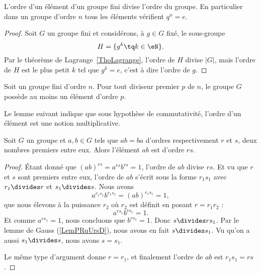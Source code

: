 \begin{corollary}       \label{CorpZItFX}
    L'ordre d'un élément d'un groupe fini divise l'ordre du groupe. En particulier dans un groupe d'ordre \( n\) tous les éléments vérifient \( q^n=e\).
\end{corollary}

\begin{proof}
    Soit \( G\) un groupe fini et considérons, à \( g \in G \) fixé, le sous-groupe
    \begin{equation}
        H=\{ g^k\tq k\in\eN \}.
    \end{equation}
    Par le théorème de Lagrange~\ref{ThoLagrange}, l'ordre de \( H\) divise \( | G |\), mais l'ordre de \( H\) est le plus petit \( k\) tel que \( g^k=e\), c'est à dire l'ordre de \( g\).
\end{proof}

\begin{theorem}    \label{THOooSUWKooICbzqM}
    Soit un groupe fini d'ordre \( n\). Pour tout diviseur premier \( p\) de \( n\), le groupe \( G\) possède au moins un élément d'ordre \( p\).
\end{theorem}

Le lemme suivant indique que sous hypothèse de commutativité, l'ordre d'un élément est une notion multiplicative.
\begin{lemma}    \label{LemyETtdy}
    Soit \( G\) un groupe et \( a,b\in G\) tels que \( ab=ba\) d'ordres respectivement \( r\) et \( s\), deux nombres premiers entre eux. Alors l'élément \( ab\) est d'ordre \( rs\).
\end{lemma}

\begin{proof}
    Étant donné que \( (ab)^{rs}=a^{rs}b^{rs}=1\), l'ordre de \( ab\) divise \( rs\). Et vu que \( r\) et \( s\) sont premiers entre eux, l'ordre de \( ab\) s'écrit sous la forme \( r_1s_1\) avec \( r_1\divides r\) et \( s_1\divides s\). Nous avons
    \begin{equation}
        a^{r_1s_1}b^{r_1s_1}=(ab)^{r_1s_1}=1,
    \end{equation}
    que nous élevons à la puissance \( r_2\) où \( r_2\) est définit en posant \(r=r_1r_2\) :
    \begin{equation}
        a^{rs_1}b^{rs_1}=1.
    \end{equation}
    Et comme \( a^{rs_1}=1\), nous concluons que \( b^{rs_1}=1\). Donc \( s\divides rs_1\). Par le lemme de Gauss (\ref{LemPRuUrsD}), nous avons en fait \( s\divides s_1\). Vu qu'on a aussi \( s_1\divides s\), nous avons \( s=s_1\).

    Le même type d'argument donne \( r=r_1\), et finalement l'ordre de \( ab\) est \( r_1s_1=rs\).
\end{proof}

